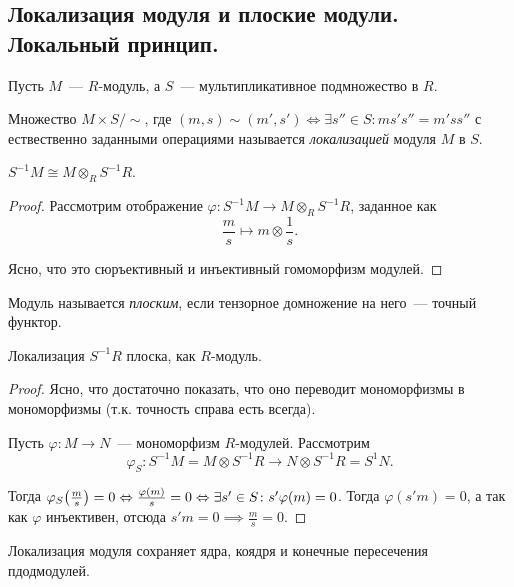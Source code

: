 	\subsection{Локализация модуля и плоские модули. Локальный принцип.}

	Пусть $M$~--- $R$-модуль, а $S$~--- мультипликативное подмножество в $R$.

	\begin{definition} 
		Множество $M \times S / \sim$, где $(m, s) \sim (m', s') \Leftrightarrow \exists s'' \in S \colon m s' s'' = m' s s''$ с ествественно заданными операциями называется \emph{локализацией} модуля $M$ в $S$.
	\end{definition}

	\begin{lemma} 
		$S^{-1}M \cong M \otimes_{R} S^{-1}R$.
	\end{lemma}

	\begin{proof}
		Рассмотрим отображение $\varphi\colon S^{-1}M \to M \otimes_{R} S^{-1}R$, заданное как 
		\[
			\frac{m}{s} \mapsto m \otimes \frac{1}{s}.
		\]

		Ясно, что это сюръективный и инъективный гомоморфизм модулей. 
	\end{proof}

	\begin{definition} 
		Модуль называется \emph{плоским}, если тензорное домножение на него~--- точный функтор. 
	\end{definition}

	\begin{statement} 
		Локализация $S^{-1}R$ плоска, как $R$-модуль. 
	\end{statement}

	\begin{proof}
		Ясно, что достаточно показать, что оно переводит мономорфизмы в мономорфизмы (т.к. точность справа есть всегда). 

		Пусть $\varphi\colon M \to N$~--- мономорфизм $R$-модулей. Рассмотрим 
		\[
			\varphi_{S}\colon S^{-1}M = M \otimes S^{-1}R \to N \otimes S^{-1}R = S^{1}N.
		\]

		Тогда $\varphi_{S}\lr*{\frac{m}{s}} = 0 \Leftrightarrow \frac{\varphi(m)}{s} = 0 \Leftrightarrow \exists s' \in S\colon s'\varphi(m) = 0$. Тогда $\varphi(s' m) = 0$, а так как $\varphi$ инъективен, отсюда $s' m = 0 \implies \frac{m}{s} = 0$.  
	\end{proof}

	\begin{corollary}
		Локализация модуля сохраняет ядра, коядря и конечные пересечения пдодмодулей. 
	\end{corollary}

